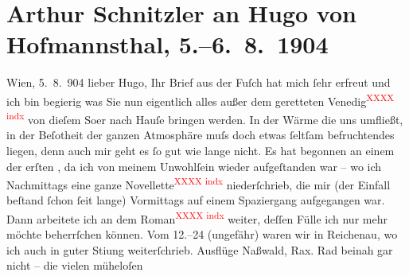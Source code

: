 

         \renewcommand{\erwaehnteWerke}{}
               \section[Arthur Schnitzler an Hugo von Hofmannsthal, 5.–6. 8. 1904]{ Arthur Schnitzler an Hugo von Hofmannsthal, 5.–6. 8. 1904}\nopagebreak{}\rehead{ }\begin{ledgroupsized}[t]{13cm}\normalsize\beginnumbering \toendnotes[C]{\smallbreak\pagebreak[2]} 
\toendnotes[C]{\smallbreak}\pstart
           \raggedleft{}{\pb}Wien, 5. 8. 904\pend
           \pstart
           lieber Hugo, Ihr Brief aus der Fuſch hat mich ſehr erfreut und ich bin begierig was Sie nun eigentlich
               alles außer dem geretteten Venedig\textcolor{red}{\textsuperscript{XXXX indx}} von dieſem So{\geminationm}er nach Hauſe bringen werden. In der Wärme die uns
               umfließt, in der Beſo{\geminationn}theit der ganzen Atmosphäre muſs
               doch etwas ſeltſam befruchtendes liegen, denn auch mir geht es ſo gut wie lange
               nicht. Es hat begonnen an einem der erſten \label{K_L01422_1v}\label{K_L01422_1h}, da ich von
               meinem Unwohlſein wieder aufgeſtanden war – wo ich \introOben{}Nachmittags\introOben{} eine ganze Novellette\textcolor{red}{\textsuperscript{XXXX indx}}
               niederſchrieb, die mir (der Einfall beſtand ſchon ſeit {\pb}lange) Vormittags auf einem Spaziergang aufgegangen war. Dann
               arbeitete ich an dem Roman\textcolor{red}{\textsuperscript{XXXX indx}}
               weiter, deſſen Fülle ich nur mehr möchte beherrſchen können. Vom
                  12.–24 (ungefähr) waren wir in Reichenau, wo ich auch in guter Sti{\geminationm}ung weiterſchrieb. Ausflüge Naßwald, Rax. Rad beinah gar nicht – die vielen müheloſen

\end{ledgroupsized}
